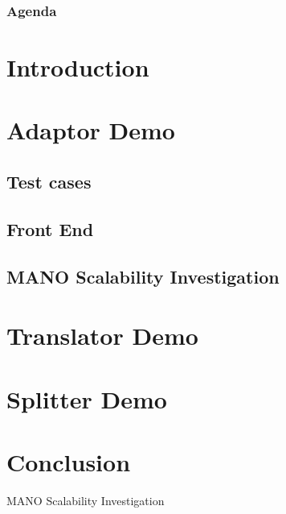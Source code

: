 \documentclass{beamer}
\begin{document}
{
\upbtitlebackground 
\begin{frame}
\titlepage %
\end{frame}
}

\begin{frame}
\frametitle{Agenda} %
\tableofcontents 

\section{Introduction}
\section{Adaptor Demo}
\subsection{Test cases}
\subsection{Front End}
\subsection{MANO Scalability Investigation}
\section{Translator Demo}
\section{Splitter Demo}
\section{Conclusion}



\end{frame}






\begin{frame}
\Huge{\centerline{MANO Scalability Investigation}}
\end{frame}




\end{document}
